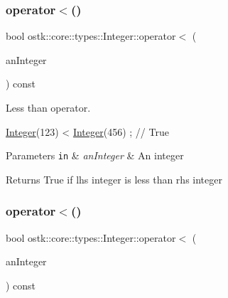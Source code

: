\subsubsection{\texorpdfstring{operator$<$()}{operator<()}\hspace{0.1cm}{\footnotesize\ttfamily [1/2]}}
{\footnotesize\ttfamily bool ostk\+::core\+::types\+::\+Integer\+::operator$<$ (\begin{DoxyParamCaption}\item[{const \hyperlink{classostk_1_1core_1_1types_1_1_integer}{Integer} \&}]{an\+Integer }\end{DoxyParamCaption}) const}



Less than operator. 


\begin{DoxyCode}
\hyperlink{classostk_1_1core_1_1types_1_1_integer_a209b939281106d4b590ad98fae291af9}{Integer}(123) < \hyperlink{classostk_1_1core_1_1types_1_1_integer_a209b939281106d4b590ad98fae291af9}{Integer}(456) ; \textcolor{comment}{// True}
\end{DoxyCode}



\begin{DoxyParams}[1]{Parameters}
\mbox{\tt in}  & {\em an\+Integer} & An integer \\
\hline
\end{DoxyParams}
\begin{DoxyReturn}{Returns}
True if lhs integer is less than rhs integer 
\end{DoxyReturn}
\mbox{\label{classostk_1_1core_1_1types_1_1_integer_a414548080c8c6d86cbb8aefd7c955b6e}} 
\subsubsection{\texorpdfstring{operator$<$()}{operator<()}\hspace{0.1cm}{\footnotesize\ttfamily [2/2]}}
{\footnotesize\ttfamily bool ostk\+::core\+::types\+::\+Integer\+::operator$<$ (\begin{DoxyParamCaption}\item[{const \hyperlink{classostk_1_1core_1_1types_1_1_integer_a76a5f41f78659f116eafaf26cecc3244}{Integer\+::\+Value\+Type} \&}]{an\+Integer }\end{DoxyParamCaption}) const}

